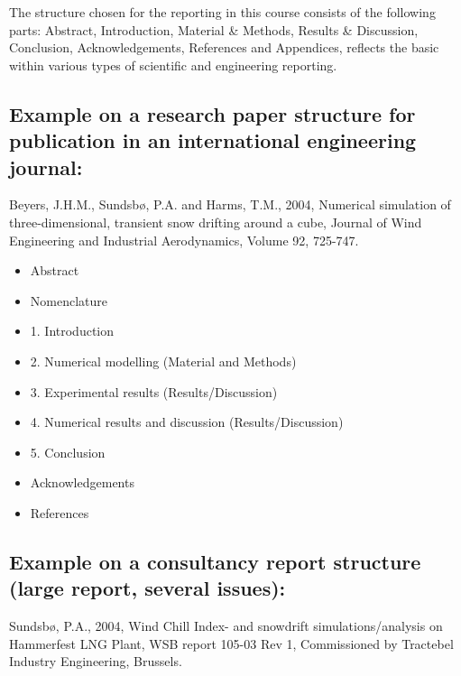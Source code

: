 \documentclass[a4paper,12pt]{extarticle}
\begin{document}
The structure chosen for the reporting in this course consists of the following parts: Abstract, Introduction, Material \& Methods, Results \& Discussion, Conclusion, Acknowledgements, References and Appendices, reflects the basic within various types of scientific and engineering reporting. 

\subsection{Example on a research paper structure for publication in an international engineering journal:}
Beyers, J.H.M., Sundsbø, P.A. and Harms, T.M., 2004, Numerical simulation of three-dimensional, transient snow drifting around a cube, Journal of Wind Engineering and Industrial Aerodynamics, Volume 92, 725-747.

\begin{itemize}
  \item Abstract
  \item Nomenclature
  \item 1. Introduction
  \item 2. Numerical modelling (Material and Methods)
  \item 3. Experimental results (Results/Discussion)
  \item 4. Numerical results and discussion (Results/Discussion)
  \item 5. Conclusion
  \item Acknowledgements
  \item References
\end{itemize}

\subsection{Example on a consultancy report structure (large report, several issues):}
Sundsbø, P.A., 2004, Wind Chill Index- and snowdrift simulations/analysis on Hammerfest LNG Plant, WSB report 105-03 Rev 1, Commissioned by Tractebel Industry Engineering, Brussels.
\end{document}
